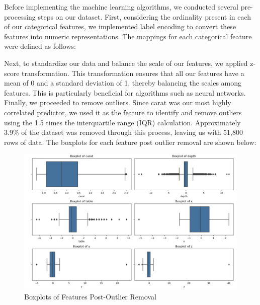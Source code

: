 \documentclass[conference]{IEEEtran}
\begin{document}
Before implementing the machine learning algorithms, we conducted several pre-processing steps on our dataset. First, considering the ordinality present in each of our categorical features, we implemented label encoding to convert these features into numeric representations. The mappings for each categorical feature were defined as follows:

\begin{table}[htbp]
    \centering
    \caption{Label Encodings for Categorical Features}
    \label{tab:label_encodings}
\end{table}

Next, to standardize our data and balance the scale of our features, we applied z-score transformation. This transformation ensures that all our features have a mean of 0 and a standard deviation of 1, thereby balancing the scales among features. This is particularly beneficial for algorithms such as neural networks. Finally, we proceeded to remove outliers. Since carat was our most highly correlated predictor, we used it as the feature to identify and remove outliers using the 1.5 times the interquartile range (IQR) calculation. Approximately 3.9\% of the dataset was removed through this process, leaving us with 51,800 rows of data. The boxplots for each feature post outlier removal are shown below:

\begin{figure}[H]
    \centering
    \includegraphics[width=0.8\linewidth]{boxplot.png} %
    \caption{Boxplots of Features Post-Outlier Removal}
    \label{fig:boxplots}
\end{figure}
\end{document}
